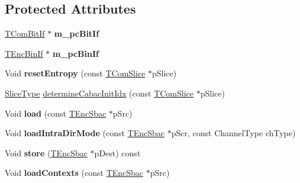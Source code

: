 \subsection*{Protected Attributes}
\begin{DoxyCompactItemize}
\item 
\mbox{\label{class_t_enc_sbac_acc23a63a42f4fe68122397cd3a2baca4}} 
\hyperlink{class_t_com_bit_if}{T\+Com\+Bit\+If} $\ast$ {\bfseries m\+\_\+pc\+Bit\+If}
\item 
\mbox{\label{class_t_enc_sbac_af452ef48ce1fc788863d72c308304b39}} 
\hyperlink{class_t_enc_bin_if}{T\+Enc\+Bin\+If} $\ast$ {\bfseries m\+\_\+pc\+Bin\+If}
\end{DoxyCompactItemize}
\begin{DoxyCompactItemize}
\item 
\mbox{\label{class_t_enc_sbac_a23aa19f5b8b61c8752a0afcb2e03cb83}} 
Void {\bfseries reset\+Entropy} (const \hyperlink{class_t_com_slice}{T\+Com\+Slice} $\ast$p\+Slice)
\item 
\hyperlink{_type_def_8h_a8fc5fd31653a387f7430d29863620f71}{Slice\+Type} \hyperlink{class_t_enc_sbac_ab9e99bf6ce44301fe50b9a8cc7ff5db7}{determine\+Cabac\+Init\+Idx} (const \hyperlink{class_t_com_slice}{T\+Com\+Slice} $\ast$p\+Slice)
\item 
\mbox{\label{class_t_enc_sbac_ad98f9320433d8f8b6ff266f238f92eac}} 
Void {\bfseries load} (const \hyperlink{class_t_enc_sbac}{T\+Enc\+Sbac} $\ast$p\+Src)
\item 
\mbox{\label{class_t_enc_sbac_aad79d7b49f9c97f97c74b14ffe1f076e}} 
Void {\bfseries load\+Intra\+Dir\+Mode} (const \hyperlink{class_t_enc_sbac}{T\+Enc\+Sbac} $\ast$p\+Scr, const Channel\+Type ch\+Type)
\item 
\mbox{\label{class_t_enc_sbac_a49bb61150f50550f078070d7ce86af3c}} 
Void {\bfseries store} (\hyperlink{class_t_enc_sbac}{T\+Enc\+Sbac} $\ast$p\+Dest) const
\item 
\mbox{\label{class_t_enc_sbac_a09f73e5824080a02f79c2a37d90d04c8}} 
Void {\bfseries load\+Contexts} (const \hyperlink{class_t_enc_sbac}{T\+Enc\+Sbac} $\ast$p\+Src)
\item 

\end{DoxyCompactItemize}
